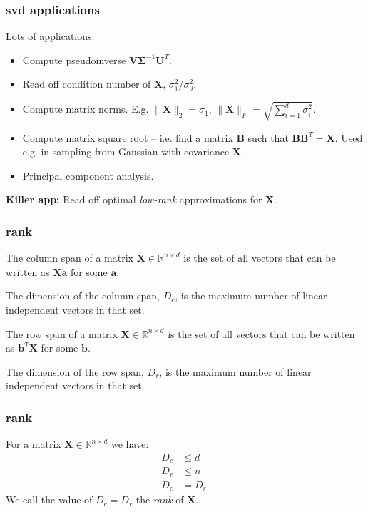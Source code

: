 \documentclass[compress]{beamer}
\newcommand{\bs}[1]{\boldsymbol{#1}}
\newcommand{\bv}[1]{\mathbf{#1}}
\newcommand{\R}{\mathbb{R}}
\begin{document}
\begin{frame}[t]
	\frametitle{svd applications}
	Lots of applications. 
	\begin{itemize}
		\item Compute pseudoinverse $\bv{V}\bs{\Sigma}^{-1} \bv{U}^T$. 
		\item Read off condition number of $\bv{X}$, $\sigma_1^2/\sigma_d^2$. 
		\item Compute matrix norms. E.g. $\|\bv{X}\|_2 = \sigma_1$, $\|\bv{X}\|_F = \sqrt{\sum_{i=1}^d \sigma_i^2}$.
		\item Compute matrix square root -- i.e. find a matrix $\bv{B}$ such that $\bv{B}\bv{B}^T = \bv{X}$.  Used e.g. in sampling from Gaussian with covariance $\bv{X}$.
		\item Principal component analysis.
	\end{itemize}
	\begin{center}
		\alert{\textbf{Killer app:} Read off optimal \emph{low-rank} approximations for $\bv{X}$.}
	\end{center}
\end{frame} 

\begin{frame}[t]
	\frametitle{rank}
	The column span of a matrix $\bv{X}\in \R^{n\times d}$ is the set of all vectors that can be written as $\bv{X}\bv{a}$ for some $\bv{a}$.

	The dimension of the column span, $D_c$, is the maximum number of linear independent vectors in that set. 

	The row span of a matrix $\bv{X}\in \R^{n\times d}$ is the set of all vectors that can be written as $\bv{b}^T\bv{X}$ for some $\bv{b}$.

	The dimension of the row span, $D_r$, is the maximum number of linear independent vectors in that set. 
\end{frame}

\begin{frame}[t]
	\frametitle{rank}
	For a matrix $\bv{X}\in \R^{n\times d}$ we have:
	\begin{align*}
		D_c &\leq d\\
		D_r &\leq n \\
		D_c &= D_r.
	\end{align*}
	We call the value of $D_c = D_r$ the \emph{rank} of $\bv{X}$.
\end{frame}
\end{document}
